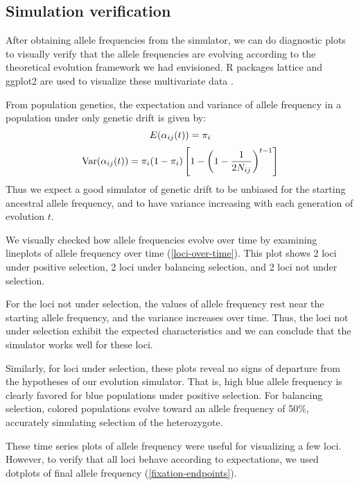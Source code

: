 \documentclass[a4paper,12pt]{article}
\begin{document}
\subsection{Simulation verification}

After obtaining allele frequencies from the simulator, we can do
diagnostic plots to visually verify that the allele frequencies are
evolving according to the theoretical evolution framework we had
envisioned. R packages lattice and ggplot2 are used to visualize these
multivariate data \cite{lattice,ggplot2}.

From population genetics, the expectation and variance of allele
frequency in a population under only genetic drift is given by:
$$E(\alpha_{ij}(t))=\pi_i$$
$$\operatorname{Var}(\alpha_{ij}(t))=\pi_i(1-\pi_i)
\left[1-\left(1-\frac{1}{2N_{ij}}\right)^{t-1}\right]$$
Thus we expect a good simulator of genetic drift to be unbiased for
the starting ancestral allele frequency, and to have variance
increasing with each generation of evolution $t$.

We visually checked how allele frequencies evolve over time by
examining lineplots of allele frequency over time
(\autoref{loci-over-time}). This plot shows 2 loci under positive
selection, 2 loci under balancing selection, and 2 loci not under
selection.


For the loci not under selection, the values of allele frequency rest
near the starting allele frequency, and the variance increases over
time. Thus, the loci not under selection exhibit the expected
characteristics and we can conclude that the simulator works well for
these loci.

Similarly, for loci under selection, these plots reveal no signs of
departure from the hypotheses of our evolution simulator. That is,
high blue allele frequency is clearly favored for blue populations
under positive selection. For balancing selection, colored populations
evolve toward an allele frequency of 50\%, accurately simulating
selection of the heterozygote.

These time series plots of allele frequency were useful for
visualizing a few loci. However, to verify that all loci behave
according to expectations, we used dotplots of final allele frequency
(\autoref{fixation-endpoints}).
\end{document}

